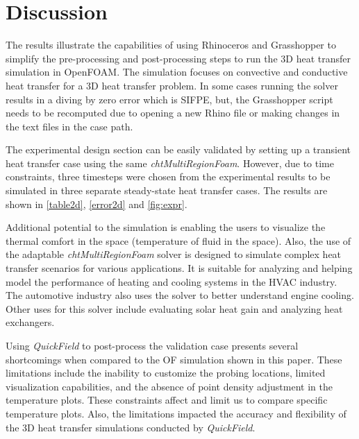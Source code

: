 \section{Discussion}

The results illustrate the capabilities of using Rhinoceros and Grasshopper to simplify the pre-processing and post-processing steps to run the 3D heat transfer simulation in OpenFOAM. The simulation focuses on convective and conductive heat transfer for a 3D heat transfer problem. 
In some cases running the solver results in a diving by zero error which is SIFPE, but, the Grasshopper script needs to be recomputed due to opening a new Rhino file or making changes in the text files in the case path. 

The experimental design section can be easily validated by setting up a transient heat transfer case using the same \textit{chtMultiRegionFoam}. However, due to time constraints, three timesteps were chosen from the experimental results to be simulated in three separate steady-state heat transfer cases. The results are shown in \ref{table2d}, \ref{error2d} and \ref{fig:expr}. 

Additional potential to the simulation is enabling the users to visualize the thermal comfort in the space (temperature of fluid in the space). Also, the use of the adaptable \textit{chtMultiRegionFoam} solver is designed to simulate complex heat transfer scenarios for various applications. It is suitable for analyzing and helping model the performance of heating and cooling systems in the HVAC  industry. The automotive industry also uses the solver to better understand engine cooling. Other uses for this solver include evaluating solar heat gain and analyzing heat exchangers.

Using \textit{QuickField} to post-process the validation case presents several shortcomings when compared to the OF simulation shown in this paper. These limitations include the inability to customize the probing locations, limited visualization capabilities, and the absence of point density adjustment in the temperature plots. These constraints affect and limit us to compare specific temperature plots. 
Also, the limitations impacted the accuracy and flexibility of the 3D heat transfer simulations conducted by \textit{QuickField}. 

